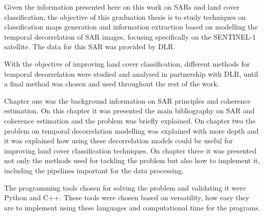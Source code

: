 Given the information presented here on this work on SARs and land cover classification, the objective of this graduation thesis is to study techniques on classification maps generation and information extraction based on modelling the temporal decorrelation of SAR images, focusing specifically on the SENTINEL-1 satellite. The data for this SAR was provided by DLR.

With the objective of improving land cover classification, different methods for temporal decorrelation were studied and analysed in partnership with DLR, until a final method was chosen and used throughout the rest of the work. 

Chapter one was the background information on SAR principles and coherence estimation. On this chapter it was presented the main bibliography on SAR and coherence estimation and the problem was briefly explained. On chapter two the problem on temporal decorrelation modelling was explained with more depth and it was explained how using these decorrelation models could be useful for improving land cover classification techniques. On chapter three it was presented not only the methods used for tackling the problem but also how to implement it, including the pipelines important for the data processing.

The programming tools chosen for solving the problem and validating it were Python and C++. These tools were chosen based on versatility, how easy they are to implement using these languages and computational time for the programs.